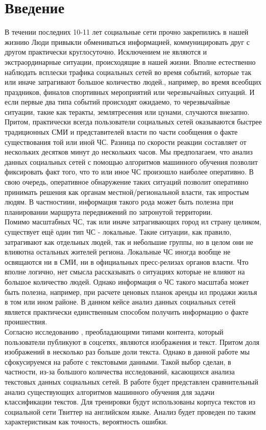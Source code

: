 \section{Введение}

В течении последних 10-11 лет социальные сети прочно закрепились в нашей жизнию Люди привыкли обмениваться информацией, коммуницировать друг с другом практически круглосуточно. Исключением не являются и экстраординарные ситуации, происходящие в нашей жизни. Вполне естественно наблюдать всплески трафика социальных сетей во время событий, которые так или иначе затрагивают большое количество людей., например, во время всеобщих праздников, финалов спортивных мероприятий или черезвычайных ситуаций. И если первые два типа событий происходят ожидаемо, то черезвычайные ситуации, такие как теракты, землятресения или цунами, случаются внезапно.\\

Притом, практически всегда пользователи социальных сетей оказываются быстрее традиционных СМИ и представителей власти по части сообщения о факте существования той или иной ЧС. Разница по скорости реакции составляет от нескольких десятков минут до нескольких часов. Мы предполагаем, что анализ данных социальных сетей с помощью алгоритмов машинного обучения позволит фиксировать факт того, что то или иное ЧС произошло наиболее оперативно. В свою очередь, оперативное обнаружение таких ситуаций позволит оперативно принимать решения как органам местной/региональной власти, так ипростым людям. В частностиии, информация такого рода может быть полезна при планировании маршрута передвижений по затронутой территории.\\

Помимо масштабных ЧС, так или иначе затрагивающих город ил страну целиком, существует ещё один тип ЧС - локальные.  Такие ситуации, как правило, затрагивают как отдельных людей, так и небольшие группы, но в целом они не влияютна остальных жителей региона. Локальные ЧС иногда вообще не освящаются ни в СМИ, ни в официальных пресс-релизах органов власти. Что вполне логично, нет смысла рассказывать о ситуациях которые не влияют на большое количество людей. Однако информация о ЧС такого масштаба может быть полезна, например, при расчете ценовых планок аренды ил продажи жилья в том или ином районе. В данном кейсе анализ данных социальных сетей является практически единственным способом получить информацию о факте проишествия.\\

Согласно исследованию \cite{muronets}, преобладающими типами контента, который пользователи публикуют в соцсетях, являются изображения и текст. Притом доля изображений в несколько раз больше доли текста. Однако в данной работе мы сфокусируемся на работе с текстовыми данными. Такой выбор сделан, в частности, из-за большого количества исследований, касающихся анализа текстовых данных социальных сетей. В работе будет представлен сравнительный анализ существующих алгоритмов машинного обучения для задачи классификации текстов. Для тренировки будут использованы корпуса текстов из социальной сети Твиттер на английском языке. Анализ будет проведен по таким характеристикам как точность, вероятность ошибки.\\

\pagebreak

